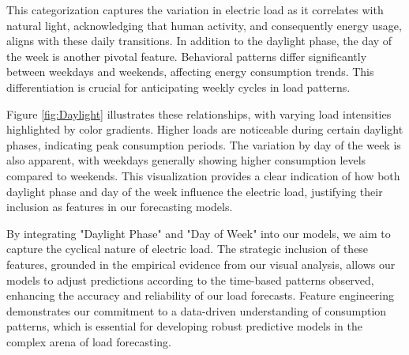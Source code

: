 \documentclass{article} %
\begin{document}
This categorization captures the variation in electric load as it correlates with natural light, acknowledging that human activity, and consequently energy usage, aligns with these daily transitions. In addition to the daylight phase, the day of the week is another pivotal feature. Behavioral patterns differ significantly between weekdays and weekends, affecting energy consumption trends. This differentiation is crucial for anticipating weekly cycles in load patterns. 

Figure \ref{fig:Daylight} illustrates these relationships, with varying load intensities highlighted by color gradients. Higher loads are noticeable during certain daylight phases, indicating peak consumption periods. The variation by day of the week is also apparent, with weekdays generally showing higher consumption levels compared to weekends. This visualization provides a clear indication of how both daylight phase and day of the week influence the electric load, justifying their inclusion as features in our forecasting models. 

By integrating "Daylight Phase" and "Day of Week" into our models, we aim to capture the cyclical nature of electric load. The strategic inclusion of these features, grounded in the empirical evidence from our visual analysis, allows our models to adjust predictions according to the time-based patterns observed, enhancing the accuracy and reliability of our load forecasts. Feature engineering demonstrates our commitment to a data-driven understanding of consumption patterns, which is essential for developing robust predictive models in the complex arena of load forecasting. 
\end{document}
